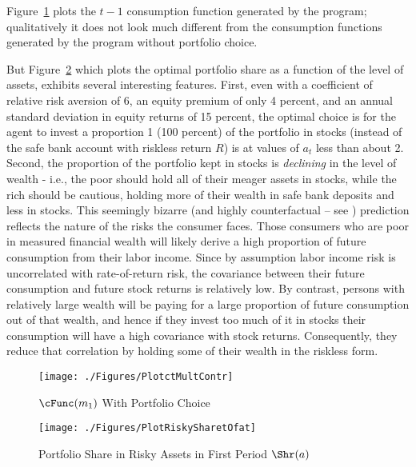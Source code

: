 \documentclass[titlepage, headings=optiontotocandhead]{Resources/texmf-local/tex/latex/econtex}
\begin{document}
Figure~\ref{fig:PlotctMultContr} plots the $t-1$ consumption function generated by the program; qualitatively it does not look much different from the consumption functions generated by the program without portfolio choice.

But Figure~\ref{fig:PlotRiskySharetOfat} which plots the optimal portfolio share as a function of the level of assets, exhibits several interesting features.  First, even with a coefficient of relative risk aversion of 6, an equity premium of only 4 percent, and an annual standard deviation in equity returns of 15 percent, the optimal choice is for the agent to invest a proportion 1 (100 percent) of the portfolio in stocks (instead of the safe bank account with riskless return $R$) is at values of $a_{t}$ less than about 2.  Second, the proportion of the portfolio kept in stocks is \textit{declining} in the level of wealth - i.e., the poor should hold all of their meager assets in stocks, while the rich should be cautious, holding more of their wealth in safe bank deposits and less in stocks.  This seemingly bizarre (and highly counterfactual -- see \cite{carroll:richportfolios}) prediction reflects the nature of the risks the consumer faces.  Those consumers who are poor in measured financial wealth will likely derive a high proportion of future consumption from their labor income.  Since by assumption labor income risk is uncorrelated with rate-of-return risk, the covariance between their future consumption and future stock returns is relatively low.  By contrast, persons with relatively large wealth will be paying for a large proportion of future consumption out of that wealth, and hence if they invest too much of it in stocks their consumption will have a high covariance with stock returns.  Consequently, they reduce that correlation by holding some of their wealth in the riskless form.

\hypertarget{PlotctMultContr}{}
\begin{figure}
  \texttt{[image: ./Figures/PlotctMultContr]}
  \caption{$\cFunc(m_{1})$ With Portfolio Choice}
  \label{fig:PlotctMultContr}
\end{figure}

\hypertarget{PlotRiskySharetOfat}{}
\begin{figure}
  \texttt{[image: ./Figures/PlotRiskySharetOfat]}
  \caption{Portfolio Share in Risky Assets in First Period $\Shr(a)$}
  \label{fig:PlotRiskySharetOfat}
\end{figure}

\hypertarget{structural-estimation}{}
\end{document}
